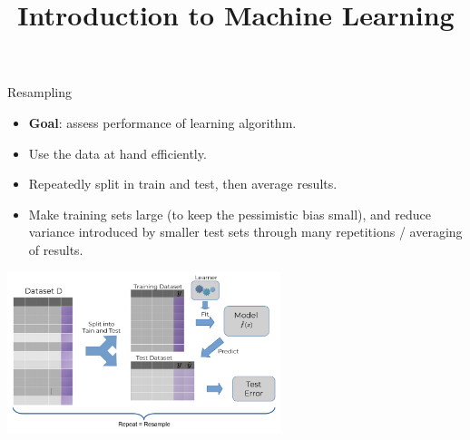 \documentclass[11pt,compress,t,notes=noshow, xcolor=table]{beamer}
\title{Introduction to Machine Learning}
\institute{\href{https://compstat-lmu.github.io/lecture_i2ml/}{compstat-lmu.github.io/lecture\_i2ml}}
\date{}
\begin{document}











\begin{vbframe}{Resampling}

\begin{small}
\begin{itemize}
  \item \textbf{Goal}: assess performance of learning algorithm.
   \item Use the data at hand efficiently.
   \item Repeatedly split in train and test, then average results.
  \item Make training sets large (to keep the pessimistic bias small),
  and reduce variance introduced by smaller test sets through many repetitions / 
  averaging of results.
\end{itemize}
\end{small}

\begin{center}
\includegraphics[width=0.6\textwidth]{figure_man/resampling_error.pdf}
\end{center}

\end{vbframe}
\end{document}
